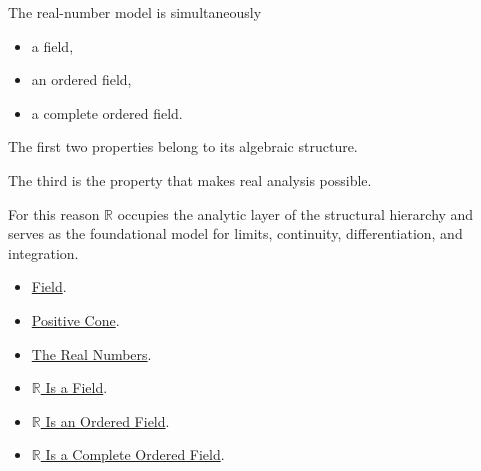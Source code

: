 \begin{remark*}

The real-number model is simultaneously

\begin{itemize}
    \item a field,
    \item an ordered field,
    \item a complete ordered field.
\end{itemize}

The first two properties belong to its algebraic structure.

The third is the property that makes real analysis possible.

For this reason $\mathbb R$ occupies the analytic layer of the structural
hierarchy and serves as the foundational model for limits, continuity,
differentiation, and integration.

\end{remark*}

\begin{dependencies}

\begin{itemize}
    \item \hyperref[def:algebraic-field]{Field}.
    \item \hyperref[def:positive-cone]{Positive Cone}.
    \item \hyperref[def:reals]{The Real Numbers}.
    \item \hyperref[thm:r-is-a-field]{$\mathbb R$ Is a Field}.
    \item \hyperref[thm:r-is-an-ordered-field]{$\mathbb R$ Is an Ordered Field}.
    \item \hyperref[thm:r-is-complete-ordered-field]{$\mathbb R$ Is a Complete Ordered Field}.
\end{itemize}

\end{dependencies}

